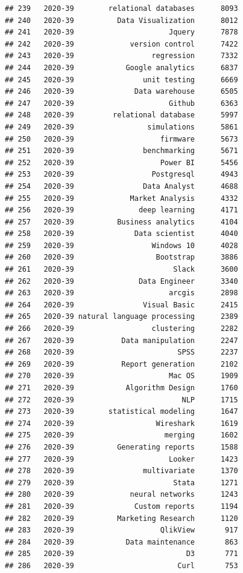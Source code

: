 \documentclass[
]{article}
\begin{document}
\begin{verbatim}
## 239   2020-39        relational databases      8093
## 240   2020-39          Data Visualization      8012
## 241   2020-39                      Jquery      7878
## 242   2020-39             version control      7422
## 243   2020-39                  regression      7332
## 244   2020-39            Google analytics      6837
## 245   2020-39                unit testing      6669
## 246   2020-39              Data warehouse      6505
## 247   2020-39                      Github      6363
## 248   2020-39         relational database      5997
## 249   2020-39                 simulations      5861
## 250   2020-39                    firmware      5673
## 251   2020-39                benchmarking      5671
## 252   2020-39                    Power BI      5456
## 253   2020-39                  Postgresql      4943
## 254   2020-39                Data Analyst      4688
## 255   2020-39             Market Analysis      4332
## 256   2020-39               deep learning      4171
## 257   2020-39          Business analytics      4104
## 258   2020-39              Data scientist      4040
## 259   2020-39                  Windows 10      4028
## 260   2020-39                   Bootstrap      3886
## 261   2020-39                       Slack      3600
## 262   2020-39               Data Engineer      3340
## 263   2020-39                      arcgis      2898
## 264   2020-39                Visual Basic      2415
## 265   2020-39 natural language processing      2389
## 266   2020-39                  clustering      2282
## 267   2020-39           Data manipulation      2247
## 268   2020-39                        SPSS      2237
## 269   2020-39           Report generation      2102
## 270   2020-39                      Mac OS      1909
## 271   2020-39            Algorithm Design      1760
## 272   2020-39                         NLP      1715
## 273   2020-39        statistical modeling      1647
## 274   2020-39                   Wireshark      1619
## 275   2020-39                     merging      1602
## 276   2020-39          Generating reports      1588
## 277   2020-39                      Looker      1423
## 278   2020-39                multivariate      1370
## 279   2020-39                       Stata      1271
## 280   2020-39             neural networks      1243
## 281   2020-39              Custom reports      1194
## 282   2020-39          Marketing Research      1120
## 283   2020-39                    QlikView       917
## 284   2020-39            Data maintenance       863
## 285   2020-39                          D3       771
## 286   2020-39                        Curl       753

\end{verbatim}
\end{document}
